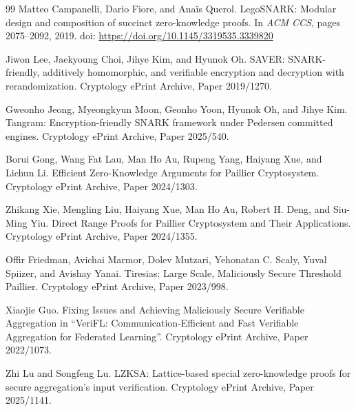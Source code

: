 \documentclass[11pt]{article}
\begin{document}
\begin{thebibliography}{99}
Matteo Campanelli, Dario Fiore, and Ana{\"i}s Querol.
\newblock LegoSNARK: Modular design and composition of succinct zero-knowledge proofs.
\newblock In {\em ACM CCS}, pages 2075--2092, 2019.
\newblock doi: \url{https://doi.org/10.1145/3319535.3339820}

Jiwon Lee, Jaekyoung Choi, Jihye Kim, and Hyunok Oh.
\newblock SAVER: SNARK-friendly, additively homomorphic, and verifiable encryption and decryption with rerandomization.
\newblock Cryptology ePrint Archive, Paper 2019/1270.

Gweonho Jeong, Myeongkyun Moon, Geonho Yoon, Hyunok Oh, and Jihye Kim.
\newblock Tangram: Encryption-friendly SNARK framework under Pedersen committed engines.
\newblock Cryptology ePrint Archive, Paper 2025/540.

Borui Gong, Wang Fat Lau, Man Ho Au, Rupeng Yang, Haiyang Xue, and Lichun Li.
\newblock Efficient Zero-Knowledge Arguments for Paillier Cryptosystem.
\newblock Cryptology ePrint Archive, Paper 2024/1303.

Zhikang Xie, Mengling Liu, Haiyang Xue, Man Ho Au, Robert H. Deng, and Siu-Ming Yiu.
\newblock Direct Range Proofs for Paillier Cryptosystem and Their Applications.
\newblock Cryptology ePrint Archive, Paper 2024/1355.

Offir Friedman, Avichai Marmor, Dolev Mutzari, Yehonatan C. Scaly, Yuval Spiizer, and Avishay Yanai.
\newblock Tiresias: Large Scale, Maliciously Secure Threshold Paillier.
\newblock Cryptology ePrint Archive, Paper 2023/998.

Xiaojie Guo.
\newblock Fixing Issues and Achieving Maliciously Secure Verifiable Aggregation in ``VeriFL: Communication-Efficient and Fast Verifiable Aggregation for Federated Learning''.
\newblock Cryptology ePrint Archive, Paper 2022/1073.

Zhi Lu and Songfeng Lu.
\newblock LZKSA: Lattice-based special zero-knowledge proofs for secure aggregation's input verification.
\newblock Cryptology ePrint Archive, Paper 2025/1141.

\end{thebibliography}
\end{document}
